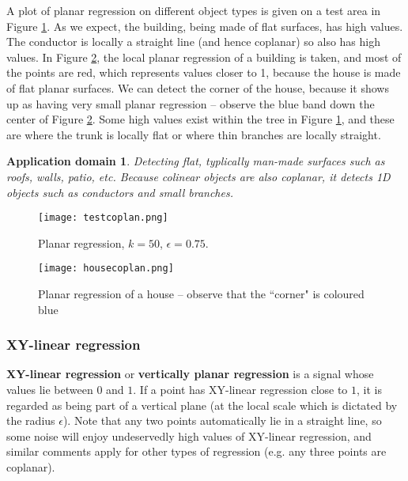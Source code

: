 \documentclass[a4paper,11pt,twoside]{article}
\newtheorem*{appdom}{Application domain}
\theoremstyle{definition}
\theoremstyle{remark}
\newenvironment{app}
   {\colorlet{shadecolor}{red!50}\begin{shaded}\begin{appdom}}
   {\end{appdom}\end{shaded}}
\begin{document}
A plot of planar regression on different object types is given on a test area in Figure \hyperref[ten]{\ref*{ten}}. As we expect, the building, being made of flat surfaces, has high values. The conductor is locally a straight line (and hence coplanar) so also has high values. In Figure \hyperref[twelve]{\ref*{twelve}}, the local planar regression of a building is taken, and most of the points are red, which represents values closer to 1, because the house is made of flat planar surfaces. We can detect the corner of the house, because it shows up as having very small planar regression -- observe the blue band down the center of Figure \hyperref[twelve]{\ref*{twelve}}. Some high values exist within the tree in Figure \hyperref[ten]{\ref*{ten}}, and these are where the trunk is locally flat or where thin branches are locally straight.

\begin{app}Detecting flat, typlically man-made surfaces such as roofs, walls, patio, etc. Because colinear objects are also coplanar, it detects 1D objects such as conductors and small branches.
\end{app}
\newpage
\begin{figure}[!h]
  \caption{Planar regression, $k=50$, $\epsilon = 0.75$.}
  \centering
    \texttt{[image: testcoplan.png]}
    \label{ten}
\end{figure}
\begin{figure}[!h]
  \caption{Planar regression of a house -- observe that the ``corner" is coloured blue}
  \centering
    \texttt{[image: housecoplan.png]}
    \label{twelve}
\end{figure}
\newpage
\subsubsection{XY-linear regression}\label{lab1}
\textbf{XY-linear regression} or \textbf{vertically planar regression} is a signal whose values lie between $0$ and $1$. If a point has XY-linear regression close to $1$, it is regarded as being part of a vertical plane (at the local scale which is dictated by the radius $\epsilon$). Note that any two points automatically lie in a straight line, so some noise will enjoy undeservedly high values of XY-linear regression, and similar comments apply for other types of regression (e.g. any three points are coplanar).
\end{document}
